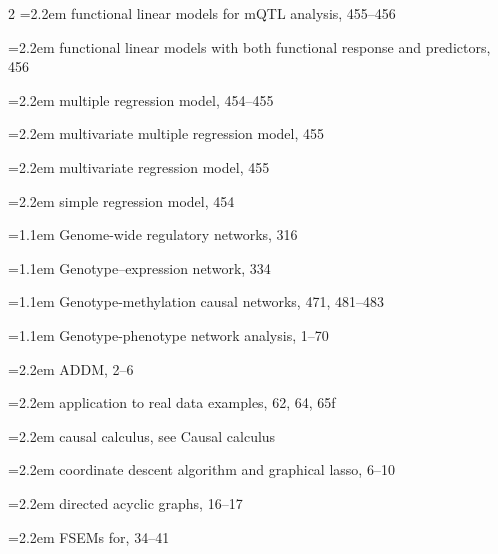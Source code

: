 \begin{multicols}{2}
\noindent\hangindent=2.2em \hspace*{1.1em}functional linear models for mQTL analysis, 455--456\par
\noindent\hangindent=2.2em \hspace*{1.1em}functional linear models with both functional response and predictors, 456\par
\noindent\hangindent=2.2em \hspace*{1.1em}multiple regression model, 454--455\par
\noindent\hangindent=2.2em \hspace*{1.1em}multivariate multiple regression model, 455\par
\noindent\hangindent=2.2em \hspace*{1.1em}multivariate regression model, 455\par
\noindent\hangindent=2.2em \hspace*{1.1em}simple regression model, 454\par
\noindent\hangindent=1.1em Genome-wide regulatory networks, 316\par
\noindent\hangindent=1.1em Genotype--expression network, 334\par
\noindent\hangindent=1.1em Genotype-methylation causal networks, 471, 481--483\par
\noindent\hangindent=1.1em Genotype-phenotype network analysis, 1--70\par
\noindent\hangindent=2.2em \hspace*{1.1em}ADDM, 2--6\par
\noindent\hangindent=2.2em \hspace*{1.1em}application to real data examples, 62, 64, 65f\par
\noindent\hangindent=2.2em \hspace*{1.1em}causal calculus, see Causal calculus\par
\noindent\hangindent=2.2em \hspace*{1.1em}coordinate descent algorithm and graphical lasso, 6--10\par
\noindent\hangindent=2.2em \hspace*{1.1em}directed acyclic graphs, 16--17\par
\noindent\hangindent=2.2em \hspace*{1.1em}FSEMs for, 34--41\par

\end{multicols}
